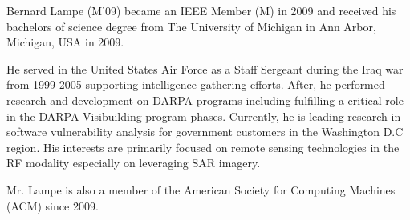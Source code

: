 \documentclass[journal]{IEEEtran}
\begin{document}
\nocite{*}



\begin{IEEEbiographynophoto}{Bernard Lampe}
(M'09) became an IEEE Member (M) in 2009 and received his bachelors of science degree from The University of Michigan in Ann Arbor, Michigan, USA in 2009.
\par He served in the United States Air Force as a Staff Sergeant during the Iraq war from 1999-2005 supporting intelligence gathering efforts. After, he performed research and development on DARPA programs including fulfilling a critical role in the DARPA Visibuilding program phases. Currently, he is leading research in software vulnerability analysis for government customers in the Washington D.C region. His interests are primarily focused on remote sensing technologies in the RF modality especially on leveraging SAR imagery.
\par Mr. Lampe is also a member of the American Society for Computing Machines (ACM) since 2009.
\end{IEEEbiographynophoto}

\end{document}
